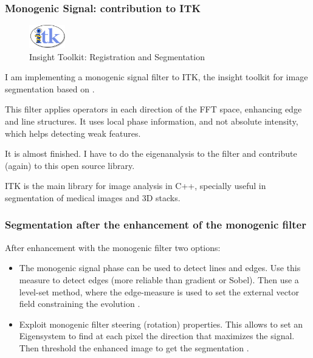 \documentclass[9pt]{beamer}
\begin{document}
\begin{frame}[t]
  \frametitle{Monogenic Signal: contribution to ITK}
    \begin{figure}[h]
      \centering
      \includegraphics[height=1cm]{./Figures/software_logos/itkLogo.png}
      \caption*{Insight Toolkit: Registration and Segmentation}
    \end{figure}
    I am implementing a monogenic signal filter to ITK, the insight toolkit for image segmentation based on \citep{chenouard_3d_2011}.

    This filter applies operators in each direction of the FFT space, enhancing edge and line structures.
    It uses local phase information, and not absolute intensity, which helps detecting weak features.

    It is almost finished. I have to do the eigenanalysis to the filter and contribute (again) to this open source library.

    ITK is the main library for image analysis in C++, specially useful in segmentation of medical images and 3D stacks.
\end{frame}

\begin{frame}[t]
  \frametitle{Segmentation after the enhancement of the monogenic filter}
     After enhancement with the monogenic filter two options:
     \begin{itemize}
       \item The monogenic signal phase can be used to detect lines and edges. Use this measure to detect edges (more reliable than gradient or Sobel). Then use a level-set method, where the edge-measure is used to set the external vector field constraining the evolution \citep{rajpoot_local-phase_2009}.
       \item Exploit monogenic filter steering (rotation) properties. This allows to set an Eigensystem to find at each pixel the direction that maximizes the signal. Then threshold the enhanced image to get the segmentation \citep{chenouard_3d_2011}.
     \end{itemize}
\end{frame}
\end{document}
